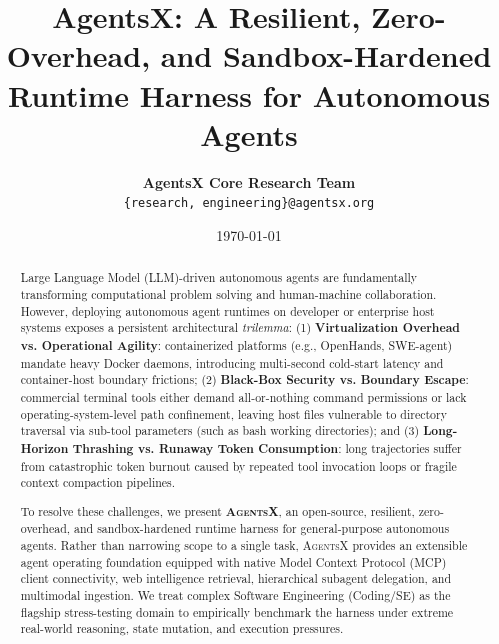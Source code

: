 \documentclass[10pt,twocolumn,letterpaper]{article}
\title{\textbf{AgentsX: A Resilient, Zero-Overhead, and Sandbox-Hardened Runtime Harness for Autonomous Agents}}
\author{
    \textbf{AgentsX Core Research Team} \\
    \texttt{\{research, engineering\}@agentsx.org}
}
\date{\today}
\begin{document}
\maketitle

\begin{abstract}
Large Language Model (LLM)-driven autonomous agents are fundamentally transforming computational problem solving and human-machine collaboration. However, deploying autonomous agent runtimes on developer or enterprise host systems exposes a persistent architectural \emph{trilemma}: (1) \textbf{Virtualization Overhead vs. Operational Agility}: containerized platforms (e.g., OpenHands, SWE-agent) mandate heavy Docker daemons, introducing multi-second cold-start latency and container-host boundary frictions; (2) \textbf{Black-Box Security vs. Boundary Escape}: commercial terminal tools either demand all-or-nothing command permissions or lack operating-system-level path confinement, leaving host files vulnerable to directory traversal via sub-tool parameters (such as bash working directories); and (3) \textbf{Long-Horizon Thrashing vs. Runaway Token Consumption}: long trajectories suffer from catastrophic token burnout caused by repeated tool invocation loops or fragile context compaction pipelines.

To resolve these challenges, we present \textbf{\textsc{AgentsX}}, an open-source, resilient, zero-overhead, and sandbox-hardened runtime harness for general-purpose autonomous agents. Rather than narrowing scope to a single task, \textsc{AgentsX} provides an extensible agent operating foundation equipped with native Model Context Protocol (MCP) client connectivity, web intelligence retrieval, hierarchical subagent delegation, and multimodal ingestion. We treat complex Software Engineering (Coding/SE) as the flagship stress-testing domain to empirically benchmark the harness under extreme real-world reasoning, state mutation, and execution pressures.


\end{abstract}
\end{document}
